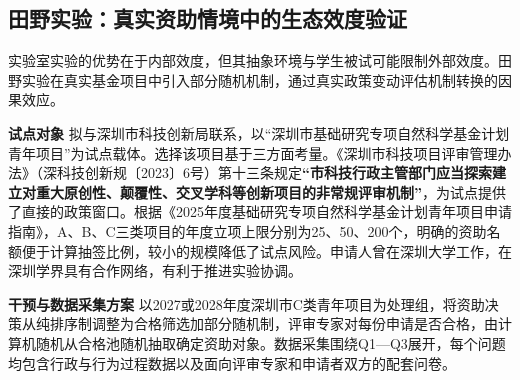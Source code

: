 \subsection{\textbf{田野实验：真实资助情境中的生态效度验证}}

实验室实验的优势在于内部效度，但其抽象环境与学生被试可能限制外部效度。田野实验在真实基金项目中引入部分随机机制，通过真实政策变动评估机制转换的因果效应。

\noindent\textbf{试点对象} \quad 拟与深圳市科技创新局联系，以“深圳市基础研究专项自然科学基金计划青年项目”为试点载体。选择该项目基于三方面考量。《深圳市科技项目评审管理办法》（深科技创新规〔2023〕6号）第十三条规定\textbf{“市科技行政主管部门应当探索建立对重大原创性、颠覆性、交叉学科等创新项目的非常规评审机制”}，为试点提供了直接的政策窗口。根据《2025年度基础研究专项自然科学基金计划青年项目申请指南》，A、B、C三类项目的年度立项上限分别为25、50、200个，明确的资助名额便于计算抽签比例，较小的规模降低了试点风险。申请人曾在深圳大学工作，在深圳学界具有合作网络，有利于推进实验协调。






\noindent\textbf{干预与数据采集方案} \quad
以2027或2028年度深圳市C类青年项目为处理组，将资助决策从纯排序制调整为合格筛选加部分随机制，评审专家对每份申请是否合格，由计算机随机从合格池随机抽取确定资助对象。数据采集围绕Q1—Q3展开，每个问题均包含行政与行为过程数据以及面向评审专家和申请者双方的配套问卷。

